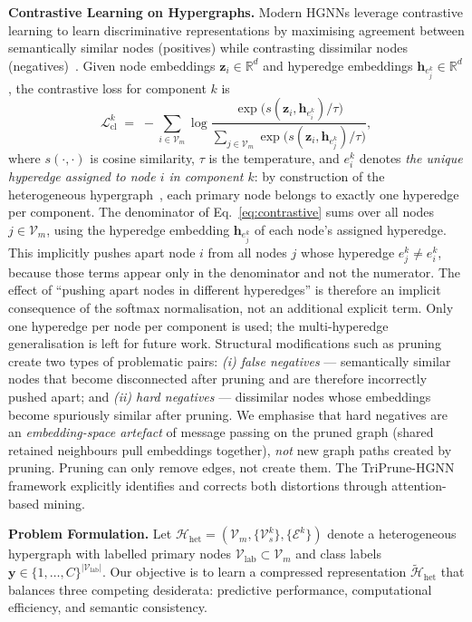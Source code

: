 \documentclass[10pt]{article}
\theoremstyle{plain}
\theoremstyle{definition}
\begin{document}
\textbf{Contrastive Learning on Hypergraphs.} Modern HGNNs leverage contrastive learning to learn discriminative representations by maximising agreement between semantically similar nodes (positives) while contrasting dissimilar nodes (negatives)~\citep{qian2024dual}. Given node embeddings $\mathbf{z}_i\!\in\!\mathbb{R}^{d}$ and hyperedge embeddings $\mathbf{h}_{e_j^{k}}\!\in\!\mathbb{R}^{d}$, the contrastive loss for component $k$ is
\begin{equation}
\mathcal{L}_{\mathrm{cl}}^{k} \;=\;
-\sum_{i\in\mathcal{V}_m}
\log\frac{\exp\!\big(s(\mathbf{z}_i,\mathbf{h}_{e_i^{k}})/\tau\big)}
         {\sum_{j\in\mathcal{V}_m}
          \exp\!\big(s(\mathbf{z}_i,\mathbf{h}_{e_j^{k}})/\tau\big)},
\label{eq:contrastive}
\end{equation}
where $s(\cdot,\cdot)$ is cosine similarity, $\tau$ is the temperature, and $e_i^{k}$ denotes \emph{the unique  hyperedge assigned to node $i$ in component $k$}: by construction of the heterogeneous hypergraph~\citep{kim2024survey}, each primary node belongs to exactly one hyperedge per component. The denominator of Eq.~\eqref{eq:contrastive} sums over all nodes $j\!\in\!\mathcal{V}_m$, using the hyperedge embedding $\mathbf{h}_{e_j^{k}}$ of each node's assigned hyperedge. This implicitly pushes apart node $i$ from all nodes $j$ whose hyperedge $e_j^{k}\!\neq\!e_i^{k}$, because those terms appear only in the denominator and not the numerator. The effect of ``pushing apart nodes in different hyperedges'' is therefore an implicit consequence of the softmax normalisation, not an additional explicit term. Only one hyperedge per node per component is used; the multi-hyperedge generalisation is left for future work. Structural modifications such as pruning create two types of problematic pairs: \emph{(i) false negatives} --- semantically similar nodes that become disconnected after pruning and are therefore incorrectly pushed apart; and \emph{(ii) hard negatives} --- dissimilar nodes whose embeddings become spuriously similar after pruning. We emphasise that hard negatives are an \emph{embedding-space  artefact} of message passing on the pruned graph (shared retained neighbours pull embeddings together), \emph{not} new graph paths created by pruning. Pruning can only remove edges, not create them. The TriPrune-HGNN framework explicitly identifies and corrects both distortions through attention-based mining.

\textbf{Problem Formulation.} Let $\mathcal{H}_{\mathrm{het}}\!=\! (\mathcal{V}_m,\{\mathcal{V}_s^{k}\},\{\mathcal{E}^{k}\})$ denote a heterogeneous hypergraph with labelled primary nodes $\mathcal{V}_{\mathrm{lab}}\!\subset\!\mathcal{V}_m$ and class labels $\mathbf{y}\!\in\!\{1,\dots,C\}^{|\mathcal{V}_{\mathrm{lab}}|}$. Our objective is to learn a compressed representation $\widetilde{\mathcal{H}}_{\mathrm{het}}$ that balances three competing desiderata: predictive performance, computational efficiency, and semantic consistency.
\end{document}
